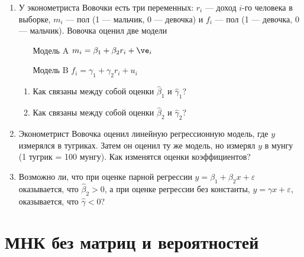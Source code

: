 \documentclass[pdftex,12pt,a4paper]{article}
\def \hb{\hat{\beta}}
\def \e{\varepsilon}
\newcommand{\solution}[1]{}
\begin{document}
\begin{enumerate}
\item У эконометриста Вовочки есть три переменных: $r_i$ --- доход $i$-го человека в выборке, $m_i$ --- пол (1 --- мальчик, 0 --- девочка) и $f_i$ --- пол (1 --- девочка, 0 --- мальчик). Вовочка оценил две модели
\begin{enumerate}
\item[Модель A] $m_i=\beta_1+\beta_2 r_i+\ve_i$
\item[Модель B] $f_i=\gamma_1+\gamma_2 r_i+u_i$
\end{enumerate}
\begin{enumerate}
\item Как связаны между собой оценки $\hb_1$ и $\hat{\gamma}_1$?
\item Как связаны между собой оценки $\hb_2$ и $\hat{\gamma}_2$? 
\end{enumerate}
\solution{ Оценки МНК линейны по объясняемой переменной. Если сложить объясняемые переменные в этих двух моделях, то получится вектор из единичек. Если строить регрессию вектора из единичек на константу и $r$, то получатся оценки коэффициентов 1 и 0. Значит, $\hb_1+\hat{\gamma}_1=1$, $\hb_2+\hat{\gamma}_2=0$ }


\item Эконометрист Вовочка оценил линейную регрессионную модель, где $y$ измерялся в тугриках. Затем он оценил ту же модель, но измерял $y$ в мунгу (1 тугрик = 100 мунгу). Как изменятся оценки коэффициентов?
\solution{Увеличатся в 100 раз}

\item Возможно ли, что при оценке парной регрессии $y=\beta_1+\beta_2 x+\e$ оказывается, что $\hb_2>0$, а при оценке регрессии без константы, $y=\gamma x+\e$, оказывается, что $\hat{\gamma}<0$?
\solution{да}


\end{enumerate}

\section{МНК без матриц и вероятностей}
\end{document}
